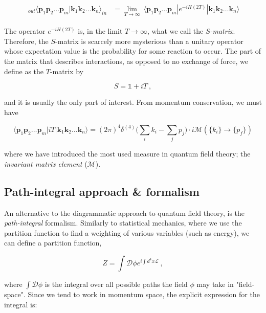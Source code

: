 \documentclass[10pt,twoside]{report}
\begin{document}
	\begin{align}
	\begin{split}
	\:_{out}\langle \bm{p}_1\bm{p}_2\ldots\bm{p}_m|\bm{k}_1\bm{k}_2\ldots\bm{k}_n\rangle_{in} &= \lim\limits_{T\rightarrow\infty} \:\langle \bm{p}_1\bm{p}_2\ldots\bm{p}_m|e^{-iH(2T)}|\bm{k}_1\bm{k}_2\ldots\bm{k}_n\rangle
	\end{split}
	\end{align}
	
	The operator $e^{-iH(2T)}$ is, in the limit $T\rightarrow\infty$, what we call the \emph{$S$-matrix}. Therefore, the $S$-matrix is scarcely more mysterious than a unitary operator whose expectation value is the probability for some reaction to occur. The part of the matrix that describes interactions, as opposed to no exchange of force, we define as the $T$-matrix by
	
	\begin{equation}
		S = \mathds{1} + iT \:,
	\end{equation}
	
	\noindent and it is usually the only part of interest. From momentum conservation, we must have
	
	\begin{equation}
		\langle \bm{p}_1\bm{p}_2\ldots\bm{p}_m|iT|\bm{k}_1\bm{k}_2\ldots\bm{k}_n\rangle = (2\pi)^4\delta^{(4)}\bigg(\sum_i k_i - \sum_j p_j\bigg)\cdot i\mathcal{M}(\{k_i\}\rightarrow\{p_f\})
	\end{equation}
	
	\noindent where we have introduced the most used measure in quantum field theory; the \emph{invariant matrix element} ($\mathcal{M}$).\\
	
	
	\subsection{Path-integral approach \& formalism}
	An alternative to the diagrammatic approach to quantum field theory, is the \emph{path-integral} formalism. Similarly to statistical mechanics, where we use the partition function to find a weighting of various variables (such as energy), we can define a partition function,
	
	\begin{equation}
		Z = \int\mathcal{D}\phi e^{i\int d^4x\mathcal{L}}\:,
	\end{equation}
	
	\noindent where $\int\mathcal{D}\phi$ is the integral over all possible paths the field $\phi$ may take in "field-space". Since we tend to work in momentum space, the explicit expression for the integral is:
	
\end{document}
